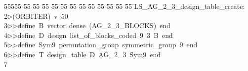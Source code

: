 %
%
\begin{tabbing}
55555 \= 55 \= 55 \= 55 \= 55 \= 55 \= 55 \= 55 \= 55 \= 55 \= 55 \= 55 \= 55 \= \>LS\_AG\_2\_3\_design\_table\_create:\\[0pt]
2\>$\triangleright$\>(ORBITER)\ v\ 50\ \\[0pt]
3\>$\triangleright$\>$\triangleright$\>define\ B\ vector\ dense\ (AG\_2\_3\_BLOCKS)\ end\ \\[0pt]
4\>$\triangleright$\>$\triangleright$\>define\ D\ design\ list\_of\_blocks\_coded\ 9\ 3\ B\ end\ \\[0pt]
5\>$\triangleright$\>$\triangleright$\>define\ Sym9\ permutation\_group\ symmetric\_group\ 9\ end\ \\[0pt]
6\>$\triangleright$\>$\triangleright$\>define\ T\ design\_table\ D\ AG\_2\_3\ Sym9\ end\\[0pt]
7\>\end{tabbing}
